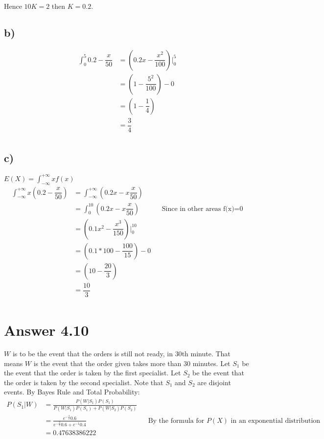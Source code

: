 \documentclass[12pt]{article}
\begin{document}
Hence $10K=2$ then $K=0.2$.

\subsection*{b)}
\begin{align*}
\int_{0}^{5}0.2-\dfrac{x}{50} & = (0.2x - \dfrac{x^2}{100} ) \vert_0^5 \\
							  & = (1 - \dfrac{5^2}{100}) - 0 \\
							  & = (1 - \dfrac{1}{4}) \\
							  & = \dfrac{3}{4} \\
\end{align*}

\subsection*{c)}
$E(X)=\int_{-\infty}^{+\infty}xf(x)$
\begin{align*}
\int_{-\infty}^{+\infty}x(0.2-\dfrac{x}{50}) & = \int_{-\infty}^{+\infty}(0.2x-x\dfrac{x}{50}) \\											  & = \int_{0}^{10}(0.2x-x\dfrac{x}{50}) &&  \text{Since in other areas f(x)=0} \\ 				  
											 & = (0.1x^2-\dfrac{x^3}{150}) \vert_0^{10} \\ 
											 & = (0.1*100-\dfrac{100}{15}) - 0 \\
											 & = (10-\dfrac{20}{3}) \\
											 & = \dfrac{10}{3} \\
\end{align*}

\section*{Answer 4.10}

$W$ is to be the event that the orders is still not ready, in $30$th minute. That means $W$ is the event that the order given takes more than $30$ minutes. Let $S_1$ be the event that the order is taken by the first specialist. Let $S_2$ be the event that the order is taken by the second specialist. Note that $S_1$ and $S_2$ are disjoint events. By Bayes Rule and Total Probability:\\

\begin{align*}
	P(S_1|W) & = \frac{P(W|S_1)P(S_1)}{P(W|S_1)P(S_1)+P(W|S_2)P(S_2)} \\
			 & = \frac{e^{-\frac{3}{2}}0.6}{e^{-\frac{3}{2}}0.6+e^{-1}0.4} && \text{By the formula for $P(X)$ in an exponential distribution} \\
			 & = 0.47638386222 
\end{align*}
\end{document}
